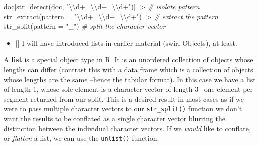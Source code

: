 \documentclass[
  letterpaper,
  DIV=11,
  numbers=noendperiod]{scrreport}
\newenvironment{Shaded}{\begin{snugshade}}{\end{snugshade}}
\newcommand{\AttributeTok}[1]{\textcolor[rgb]{0.00,0.00,0.00}{#1}}
\newcommand{\CommentTok}[1]{\textcolor[rgb]{0.00,0.00,0.00}{\textit{#1}}}
\newcommand{\FunctionTok}[1]{\textcolor[rgb]{0.00,0.00,0.00}{#1}}
\newcommand{\NormalTok}[1]{\textcolor[rgb]{0.00,0.00,0.00}{#1}}
\newcommand{\SpecialCharTok}[1]{\textcolor[rgb]{0.00,0.00,0.00}{#1}}
\newcommand{\StringTok}[1]{\textcolor[rgb]{0.00,0.00,0.00}{#1}}
\providecommand{\tightlist}{%
  \setlength{\itemsep}{0pt}\setlength{\parskip}{0pt}}\usepackage{longtable,booktabs,array}
\theoremstyle{definition}
\theoremstyle{remark}
\begin{document}
\begin{Shaded}
\begin{Highlighting}[]
\NormalTok{doc[}\FunctionTok{str\_detect}\NormalTok{(doc, }\StringTok{"}\SpecialCharTok{\textbackslash{}\textbackslash{}}\StringTok{d+\_}\SpecialCharTok{\textbackslash{}\textbackslash{}}\StringTok{d+\_}\SpecialCharTok{\textbackslash{}\textbackslash{}}\StringTok{d+"}\NormalTok{)] }\SpecialCharTok{|\textgreater{}} \CommentTok{\# isolate pattern}
  \FunctionTok{str\_extract}\NormalTok{(}\AttributeTok{pattern =} \StringTok{"}\SpecialCharTok{\textbackslash{}\textbackslash{}}\StringTok{d+\_}\SpecialCharTok{\textbackslash{}\textbackslash{}}\StringTok{d+\_}\SpecialCharTok{\textbackslash{}\textbackslash{}}\StringTok{d+"}\NormalTok{) }\SpecialCharTok{|\textgreater{}} \CommentTok{\# extract the pattern}
  \FunctionTok{str\_split}\NormalTok{(}\AttributeTok{pattern =} \StringTok{"\_"}\NormalTok{) }\CommentTok{\# split the character vector}
\end{Highlighting}
\end{Shaded}

\begin{itemize}
\tightlist
\item
  {[}{]} I will have introduced lists in earlier material (swirl
  Objects), at least.
\end{itemize}

A \textbf{list} is a special object type in R. It is an unordered
collection of objects whose lengths can differ (contrast this with a
data frame which is a collection of objects whose lengths are the same
--hence the tabular format). In this case we have a list of length 1,
whose sole element is a character vector of length 3 --one element per
segment returned from our split. This is a desired result in most cases
as if we were to pass multiple character vectors to our
\texttt{str\_split()} function we don't want the results to be conflated
as a single character vector blurring the distinction between the
individual character vectors. If we \emph{would} like to conflate, or
\emph{flatten} a list, we can use the \texttt{unlist()} function.
\end{document}
